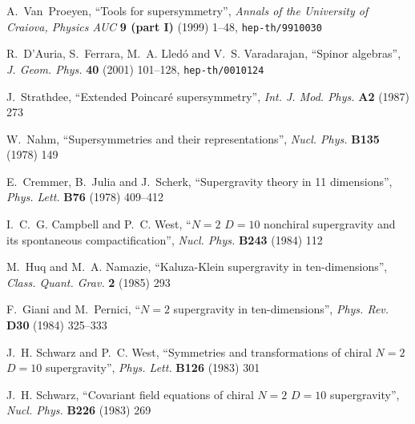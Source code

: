 \documentclass[a4paper,11pt,twoside]{article}
\begin{document}
%
%
\providecommand{\href}[2]{#2}\begingroup\raggedright\begin{thebibliography}{10}

{\sc A.~Van~Proeyen}, ``Tools for supersymmetry'',  {\sl Annals of the
  University of Craiova, Physics AUC} {\bf 9 (part I)} (1999) 1--48,
\href{http://www.arXiv.org/abs/hep-th/9910030}{{\tt hep-th/9910030}}

{\sc R.~D'Auria, S.~Ferrara, M.~A. Lled{\'o}  and V.~S. Varadarajan},
``Spinor
  algebras'',  {\sl J. Geom. Phys.} {\bf 40} (2001) 101--128,
\href{http://www.arXiv.org/abs/hep-th/0010124}{{\tt hep-th/0010124}}

{\sc J.~Strathdee}, ``Extended Poincar{\'e} supersymmetry'',  {\sl Int. J.
Mod.
  Phys.} {\bf A2} (1987)
273

{\sc W.~Nahm}, ``Supersymmetries and their representations'',  {\sl Nucl.
  Phys.} {\bf B135} (1978)
149

{\sc E.~Cremmer, B.~Julia  and J.~Scherk}, ``Supergravity theory in 11
  dimensions'',  {\sl Phys. Lett.} {\bf B76} (1978)
409--412

{\sc I.~C.~G. Campbell and P.~C. West}, ``$N=2$ $D = 10$ nonchiral
supergravity
  and its spontaneous compactification'',  {\sl Nucl. Phys.} {\bf B243} (1984)
112

{\sc M.~Huq and M.~A. Namazie}, ``Kaluza-Klein supergravity in
  ten-dimensions'',  {\sl Class. Quant. Grav.} {\bf 2} (1985)
293

{\sc F.~Giani and M.~Pernici}, ``$N=2$ supergravity in ten-dimensions'',
{\sl
  Phys. Rev.} {\bf D30} (1984)
325--333

{\sc J.~H. Schwarz and P.~C. West}, ``Symmetries and transformations of
chiral
  $N=2$ $D = 10$ supergravity'',  {\sl Phys. Lett.} {\bf B126} (1983)
301

{\sc J.~H. Schwarz}, ``Covariant field equations of chiral $N=2$ $D = 10$
  supergravity'',  {\sl Nucl. Phys.} {\bf B226} (1983)
269


\end{thebibliography}
\end{document}
